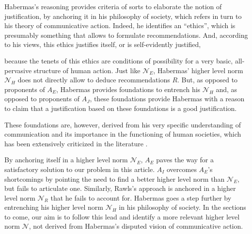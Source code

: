 \documentclass[preprint, french, english, 11pt, authoryear]{elsarticle}%
\newcommand{\adv}{\mathscr{N}}
\begin{document}
Habermas's reasoning provides criteria of sorts to elaborate the notion of justification, by anchoring it in his philosophy of society, which refers in turn to his theory of communicative action. 
Indeed, he identifies an “ethics”, which is presumably something that allows to formulate recommendations. And, according to his views, this ethics justifies itself, or is self-evidently justified,

because the tenets of this ethics are conditions of possibility for a very basic, all-pervasive structure of human action. 
Just like $\mathscr{N}_E$, Habermas' higher level norm $\mathscr{N}_{H}$ does not directly allow to deduce recommendations $R$. 
But, as opposed to proponents of $A_E$, Habermas provides foundations to entrench his $\mathscr{N}_{H}$ and, as opposed to proponents of $A_J$, these foundations provide Habermas with a reason to claim that a justification based on these foundations is a good justification. 

These foundations are, however, derived from his very specific understanding of communication and its importance in the functioning of human societies, which has been extensively criticized in the literature \citep{heath_communicative_2001,honneth_kritik_1985,benhabib_situating_1992}. 

By anchoring itself in a higher level norm $\mathscr{N}_E$, $A_E$ paves the way for a satisfactory solution to our problem in this article. 
$A_I$ overcomes $A_E$'s shortcomings by pointing the need to find a better higher level norm than $\mathscr{N}_E$, but fails to articulate one. Similarly, Rawls's approach is anchored in a higher level norm $\mathscr{N}_{R}$ that he fails to account for. 
Habermas goes a step further by entrenching his higher level norm $\mathscr{N}_{H}$ in his philosophy of society. In the sections to come, our aim is to follow this lead and identify a more relevant higher level norm $\adv$, not derived from Habermas's disputed vision of communicative action. 
\end{document}
